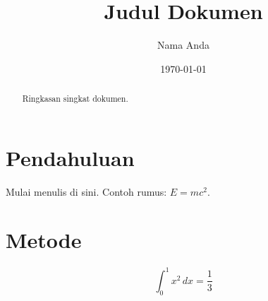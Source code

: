 \documentclass[11pt]{article}
\title{Judul Dokumen}
\author{Nama Anda}
\date{\today}
\begin{document}
\maketitle

\begin{abstract}
Ringkasan singkat dokumen.
\end{abstract}

\section{Pendahuluan}
Mulai menulis di sini. Contoh rumus: $E = mc^2$.

\section{Metode}
\begin{equation}
  \int_0^1 x^2 \, dx = \frac{1}{3}
\end{equation}
\end{document}
